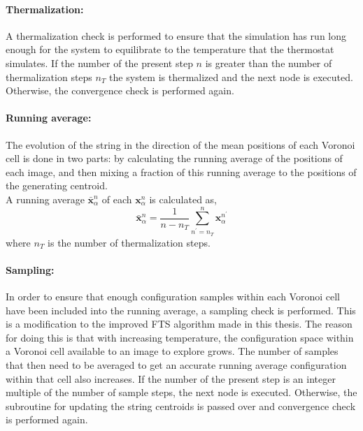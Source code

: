 \documentclass{article}
\begin{document}
\paragraph*{Thermalization:}

A thermalization check is performed to ensure that the simulation has run long enough for the system to equilibrate to the temperature that the thermostat simulates. If the number of the present step $n$ is greater than the number of thermalization steps $n_T$ the system is thermalized and the next node is executed. Otherwise, the convergence check is performed again.

\paragraph*{Running average:}

The evolution of the string in the direction of the mean positions of each Voronoi cell is done in two parts: by calculating the running average of the positions of each image, and then mixing a fraction of this running average to the positions of the generating centroid. ~\\

\noindent A running average $\bm{\bar{x}}_{\alpha}^n$ of each $\bm{x}_{\alpha}^n$ is calculated as,
%
\begin{equation} \label{eq:24}
\bm{\bar{x}}_{\alpha}^n =  \dfrac{1}{n - n_T} \sum_{n^{\prime} = n_T}^{n} \bm{x}_{\alpha}^{n^{\prime}}
\end{equation}
%
where $n_T$ is the number of thermalization steps.

\paragraph*{Sampling:}

In order to ensure that enough configuration samples within each Voronoi cell have been included into the running average, a sampling check is performed. This is a modification to the improved FTS algorithm \cite{Vanden-Eijnden2009} made in this thesis. The reason for doing this is that with increasing temperature, the configuration space within a Voronoi cell available to an image to explore grows. The number of samples that then need to be averaged to get an accurate running average configuration within that cell also increases. If the number of the present step is an integer multiple of the number of sample steps, the next node is executed. Otherwise, the subroutine for updating the string centroids is passed over and convergence check is performed again.
\end{document}
